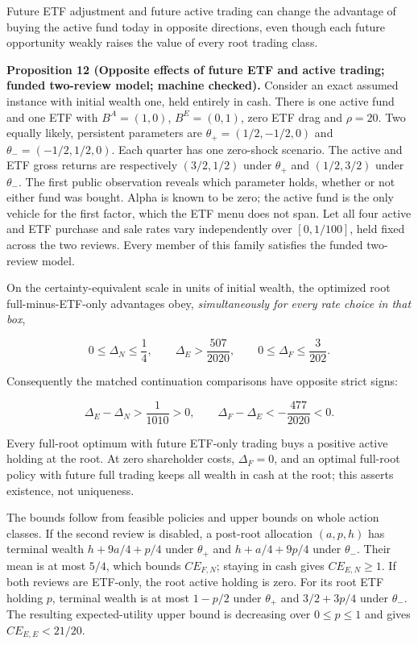 \documentclass[11pt]{article}
\begin{document}
Future ETF adjustment and future active trading can change the
advantage of buying the active fund today in opposite directions,
even though each future opportunity weakly raises the value of
every root trading class.

\label{res:Proposition-12}
\textbf{Proposition 12 (Opposite effects of future ETF and active trading; funded two-review model; machine checked).}
Consider an exact assumed instance with initial wealth one, held
entirely in cash. There is one active fund and one ETF with
\(B^A=(1,0)\), \(B^E=(0,1)\), zero ETF drag and
\(\rho=20\). Two equally likely, persistent parameters are
\(\theta_+=(1/2,-1/2,0)\) and
\(\theta_-=(-1/2,1/2,0)\). Each quarter has one zero-shock
scenario. The active and ETF gross returns are respectively
\((3/2,1/2)\) under \(\theta_+\) and \((1/2,3/2)\)
under \(\theta_-\). The first public observation reveals which
parameter holds, whether or not either fund was bought. Alpha is
known to be zero; the active fund is the only vehicle for the
first factor, which the ETF menu does not span. Let all four
active and ETF purchase and sale rates vary independently over
\([0,1/100]\), held fixed across the two reviews. Every member
of this family satisfies the funded two-review model.

On the certainty-equivalent scale in units of initial wealth,
the optimized root full-minus-ETF-only advantages obey,
\emph{simultaneously for every rate choice in that box},

\begin{equation*}
0\leq\Delta_N\leq\frac14,\qquad
\Delta_E>\frac{507}{2020},\qquad
0\leq\Delta_F\leq\frac{3}{202}.
\tag{29}\label{eq:29}
\end{equation*}

Consequently the matched continuation comparisons have opposite
strict signs:

\begin{equation*}
\Delta_E-\Delta_N>\frac{1}{1010}>0,\qquad
\Delta_F-\Delta_E<-\frac{477}{2020}<0.
\tag{30}\label{eq:30}
\end{equation*}

Every full-root optimum with future ETF-only trading buys a
positive active holding at the root. At zero shareholder costs,
\(\Delta_F=0\), and an optimal full-root policy with future full
trading keeps all wealth in cash at the root; this asserts
existence, not uniqueness.

The bounds follow from feasible policies and upper bounds on
whole action classes. If the second review is disabled, a
post-root allocation \((a,p,h)\) has terminal wealth
\(h+9a/4+p/4\) under \(\theta_+\) and
\(h+a/4+9p/4\) under \(\theta_-\). Their mean is at most
\(5/4\), which bounds \(CE_{F,N}\); staying in cash gives
\(CE_{E,N}\geq1\). If both reviews are ETF-only, the root
active holding is zero. For its root ETF holding \(p\), terminal
wealth is at most \(1-p/2\) under \(\theta_+\) and
\(3/2+3p/4\) under \(\theta_-\). The resulting
expected-utility upper bound is decreasing over \(0\leq p\leq1\)
and gives \(CE_{E,E}<21/20\).
\end{document}
